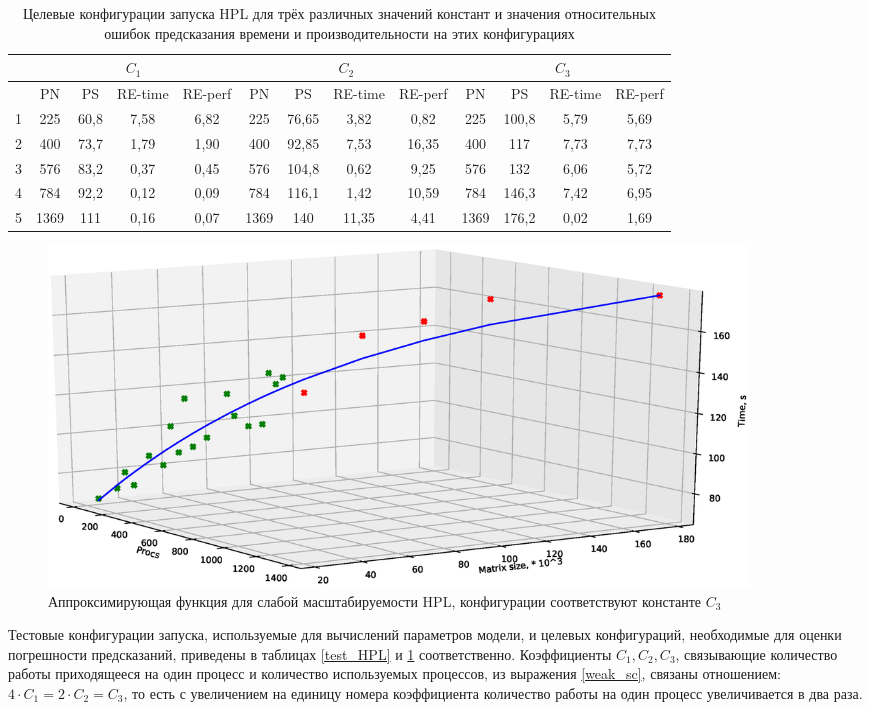 	\begin{table}
		\begin{tabular}{|r|c|c|c|c|c|c|c|c|c|c|c|c|}
		\hline
		& \multicolumn{4}{|c|}{\(C_1\)} & \multicolumn{4}{|c|}{\(C_2\)} & \multicolumn{4}{|c|}{\(C_3\)} \\ \hline
		\textnumero & PN & PS & RE-time & RE-perf & PN & PS & RE-time & RE-perf & PN & PS & RE-time & RE-perf \\ \hline
		1 & 225 & 60,8 & 7,58 &	6,82 & 225 & 76,65 & 3,82 & 0,82 & 225 & 100,8 & 5,79 & 5,69 \\ \hline
		2 & 400 & 73,7 & 1,79 & 1,90 & 400 & 92,85 & 7,53 & 16,35 & 400 & 117 & 7,73 & 7,73 \\ \hline
		3 & 576 & 83,2 & 0,37 & 0,45 & 576 & 104,8 & 0,62 & 9,25 & 576 & 132 & 6,06 & 5,72 \\ \hline
		4 & 784 & 92,2 & 0,12 & 0,09 & 784 & 116,1 & 1,42 & 10,59 & 784 & 146,3 & 7,42 & 6,95 \\ \hline
		5 & 1369 & 111 & 0,16 & 0,07 & 1369 & 140 & 11,35 & 4,41 & 1369 & 176,2 & 0,02 & 1,69 \\ \hline
		\end{tabular}
		\caption{Целевые конфигурации запуска HPL для трёх различных значений констант и значения относительных ошибок предсказания времени и производительности на этих конфигурациях}
		\label{target_HPL}
	\end{table}

	\begin{figure}[t]
		\centering
		\includegraphics[width=0.9\textwidth]{hpl_k3}
		\caption{Аппроксимирующая функция для слабой масштабируемости HPL, конфигурации соответствуют константе \(C_3\)}
		\label{HPL_C_3_figure}
	\end{figure}

	Тестовые конфигурации запуска, используемые для вычислений параметров модели, и целевых конфигураций, необходимые для оценки погрешности предсказаний, приведены в таблицах \ref{test_HPL} и \ref{target_HPL} соответственно. Коэффициенты \(C_1, C_2, C_3\), связывающие количество работы приходящееся на один процесс и количество используемых процессов, из выражения \ref{weak_sc}, связаны отношением: \(4 \cdot C_1 = 2 \cdot C_2 = C_3 \), то есть с увеличением на единицу номера коэффициента количество работы на один процесс увеличивается в два раза.

